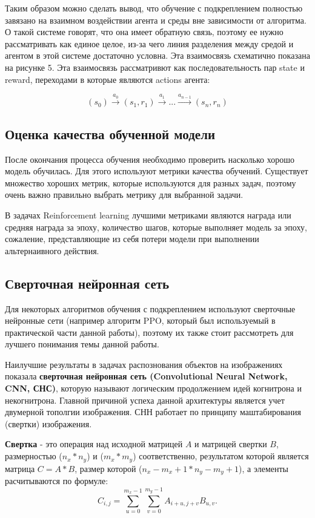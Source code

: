 \documentclass[bachelor, och, coursework]{shiza}
\begin{document}
Таким образом можно сделать вывод, что обучение с подкреплением полностью завязано на взаимном воздействии агента и среды вне зависимости от алгоритма.
О такой системе говорят, что она имеет обратную связь, поэтому ее нужно рассматривать как единое целое, из-за чего линия разделения между средой и агентом
в этой системе достаточно условна. Эта взаимосвязь схематично показана на рисунке 5. Эта взаимосвязь рассматривют как последовательность пар state и
reward, переходами в которые являются actions агента:

\begin{equation}
    (s_0) \stackrel{a_0}{\rightarrow} (s_1, r_1) \stackrel{a_1}{\rightarrow} ... \stackrel{a_{n-1}}{\rightarrow} (s_n, r_n)
\end{equation}

\subsection{Оценка качества обученной модели}
После окончания процесса обучения необходимо проверить насколько хорошо модель обучилась. Для этого используют метрики качества обучений. Существует множество хороших метрик,
которые используются для разных задач, поэтому очень важно правильно выбрать метрику для выбранной задачи.

В задачах Reinforcement learning лучшими метриками являются награда или средняя награда за эпоху, количество шагов, которые выполняет модель за эпоху, сожаление, представляющие из себя
потери модели при выполнении альтернаивного действия.

\subsection{Сверточная нейронная сеть}

Для некоторых алгоритмов обучения с подкреплением используют сверточные нейронные сети (например алгоритм PPO, который был используемый в практической части данной работы),
поэтому их также стоит рассмотреть для лучшего понимания темы данной работы.

Наилучшие результаты в задачах распознования объектов на изображениях показала \textbf{сверточная нейронная сеть (Convolutional Neural Network, CNN, СНС)}, 
которую называют логическим продолжением идей когнитрона и некогнитрона. Главной причиной успеха данной архитектуры является учет двумерной тополгии изображения.
СНН работает по принципу маштабирования (свертки) изображения.

\textbf{Свертка} - это операция над исходной матрицей $A$ и матрицей свертки $B$, размерностью  ($n_x * n_y$) и ($m_x * m_y$) соответственно, результатом которой является матрица $C = A * B$,
размер которой ($n_x - m_x + 1 * n_y - m_y + 1$), а элементы расчитываются по формуле:
\begin{equation}
    C_{i,j} = \sum\limits_{u=0}^{m_x-1}\sum\limits_{v=0}^{m_y-1}A_{i+u,j+v}B_{u,v}.
\end{equation}
\end{document}
